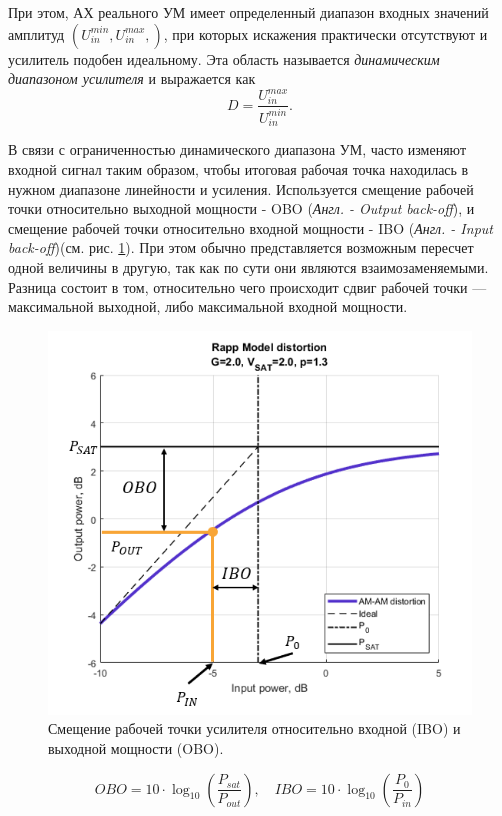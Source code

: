 При этом, АХ реального УМ имеет определенный диапазон входных значений
амплитуд $(U_{in}^{min},U_{in}^{max},)$, при которых искажения практически
отсутствуют и усилитель подобен идеальному. Эта область называется
\textit{динамическим диапазоном усилителя} и выражается как
\begin{equation}
    D = \frac{U_{in}^{max}}{U_{in}^{min}}.
\end{equation}

В связи с ограниченностью динамического диапазона УМ, часто изменяют
входной сигнал таким образом, чтобы итоговая рабочая точка находилась в
нужном диапазоне линейности и усиления. Используется смещение рабочей точки
относительно выходной мощности - OBO (\textit{Англ. - Output back-off}), и
смещение рабочей точки относительно входной мощности - IBO (\textit{Англ. -
Input back-off})(см. рис. \ref{fig:obo_ibo}). При этом обычно
представляется возможным пересчет одной величины в другую, так как по сути
они являются взаимозаменяемыми. Разница состоит в том, относительно чего
происходит сдвиг рабочей точки — максимальной выходной, либо максимальной
входной мощности.

\begin{figure}[h!]
    \centering
    \includegraphics[width=0.7\linewidth]{figs/pa_obo_ibo.png}
    \caption{Смещение рабочей точки усилителя относительно входной (IBO) и выходной мощности (OBO).}
    \label{fig:obo_ibo}
\end{figure}

\begin{equation}
    OBO = 10 \cdot \log_{10}\left(\frac{P_{sat}}{P_{out}}\right), \quad
    IBO = 10 \cdot \log_{10}\left(\frac{P_{0}}{P_{in}}\right)
\end{equation}

